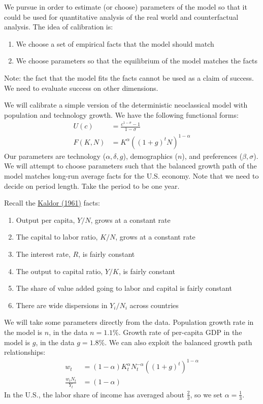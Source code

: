 \documentclass[10pt]{article}
\begin{document}
\begin{definition}
	We pursue  in order to estimate (or choose) parameters of the model so that it could be used for quantitative analysis of the real world and counterfactual analysis. The idea of calibration is:
	\begin{enumerate}
		\item We choose a set of empirical facts that the model should match
		\item We choose parameters so that the equilibrium of the model matches the facts
	\end{enumerate}
	Note: the fact that the model fits the facts cannot be used as a claim of success. We need to evaluate success on other dimensions.
\end{definition}

\begin{example}
	We will calibrate a simple version of the deterministic neoclassical model with population and technology growth. We have the following functional forms:
	\begin{align*}
		U(c) &= \frac{c^{1-\sigma} - 1}{1 - \sigma} \\
		F(K,N) &= K^\alpha ((1 + g)^t N)^{1-\alpha}
	\end{align*}
	Our parameters are technology ($\alpha,\delta,g$), demographics ($n$), and preferences ($\beta,\sigma$). We will attempt to choose parameters such that the balanced growth path of the model matches long-run average facts for the U.S. economy. Note that we need to decide on period length. Take the period to be one year.
	
	Recall the \href{https://link.springer.com/chapter/10.1007/978-1-349-08452-4_10}{Kaldor (1961)} facts:
\begin{enumerate}
	\item Output per capita, $Y / N$, grows at a constant rate
	\item The capital to labor ratio, $K / N$, grows at a constant rate
	\item The interest rate, $R$, is fairly constant
	\item The output to capital ratio, $Y / K$, is fairly constant
	\item The share of value added going to labor and capital is fairly constant
	\item There are wide dispersions in $Y_i / N_i$ across countries
\end{enumerate}

We will take some parameters directly from the data. Population growth rate in the model is $n$, in the data $n = 1.1\%$. Growth rate of per-capita GDP in the model is $g$, in the data $g = 1.8\%$. We can also exploit the balanced growth path relationships:
\begin{align*}
	w_t &= (1-\alpha) K_t^\alpha N_t^{-\alpha}((1 + g)^t)^{1-\alpha} \\
	\frac{w_tN_t}{Y_t} &= (1-\alpha)
\end{align*}
In the U.S., the labor share of income has averaged about $\frac{2}{3}$, so we set $\alpha = \frac{1}{3}$. 


\end{example}
\end{document}
